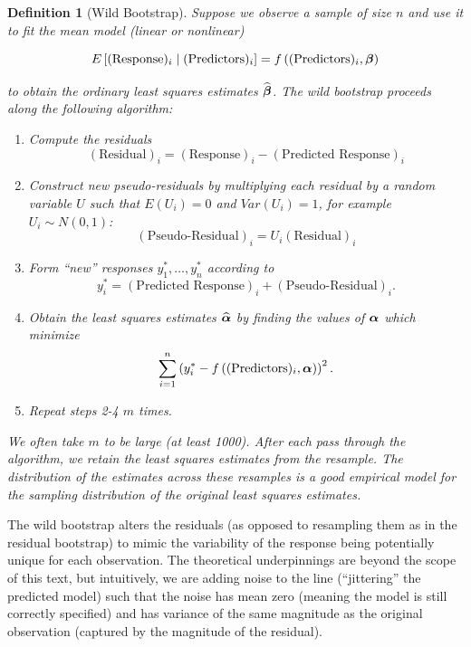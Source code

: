 \documentclass[
]{book}
\providecommand{\tightlist}{%
  \setlength{\itemsep}{0pt}\setlength{\parskip}{0pt}}
\theoremstyle{plain}
\theoremstyle{mydefn}
\newtheorem{definition}{Definition}[chapter]
\theoremstyle{myexmpl}
\theoremstyle{remark}
\begin{document}
\begin{definition}[Wild Bootstrap]
\protect\hypertarget{def:defn-wild-bootstrap}{}{\label{def:defn-wild-bootstrap} {} }Suppose we observe a sample of size \(n\) and use it to fit the mean model (linear or nonlinear)

\[E\left[(\text{Response})_i \mid (\text{Predictors})_i\right]= f\left((\text{Predictors})_i, \boldsymbol{\beta}\right)\]

to obtain the ordinary least squares estimates \(\widehat{\boldsymbol{\beta}}\). The wild bootstrap proceeds along the following algorithm:

\begin{enumerate}
\def\labelenumi{\arabic{enumi}.}
\tightlist
\item
  Compute the residuals
  \[(\text{Residual})_i = (\text{Response})_i - (\text{Predicted Response})_i\]
\item
  Construct new pseudo-residuals by multiplying each residual by a random variable \(U\) such that \(E\left(U_i\right) = 0\) and \(Var\left(U_i\right) = 1\), for example \(U_i \sim N(0,1)\):
  \[(\text{Pseudo-Residual})_i = U_i (\text{Residual})_i\]
\item
  Form ``new'' responses \(y_1^*, \dotsc, y_n^*\) according to
  \[y_i^* = (\text{Predicted Response})_i + (\text{Pseudo-Residual})_i.\]
\item
  Obtain the least squares estimates \(\widehat{\boldsymbol{\alpha}}\) by finding the values of \(\boldsymbol{\alpha}\) which minimize
  \[\sum_{i=1}^{n} \left(y_i^* - f\left((\text{Predictors})_i, \boldsymbol{\alpha}\right)\right)^2.\]
\item
  Repeat steps 2-4 \(m\) times.
\end{enumerate}

We often take \(m\) to be large (at least 1000). After each pass through the algorithm, we retain the least squares estimates from the resample. The distribution of the estimates across these resamples is a good empirical model for the sampling distribution of the original least squares estimates.
\end{definition}

The wild bootstrap alters the residuals (as opposed to resampling them as in the residual bootstrap) to mimic the variability of the response being potentially unique for each observation. The theoretical underpinnings are beyond the scope of this text, but intuitively, we are adding noise to the line (``jittering'' the predicted model) such that the noise has mean zero (meaning the model is still correctly specified) and has variance of the same magnitude as the original observation (captured by the magnitude of the residual).
\end{document}
